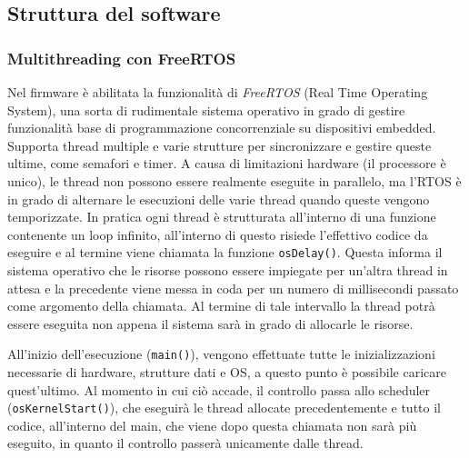 \subsection{Struttura del software}

\subsubsection{Multithreading con FreeRTOS}

Nel firmware \`e abilitata la funzionalit\`a di \textit{FreeRTOS} (Real Time Operating System), una sorta di rudimentale sistema operativo in grado di gestire funzionalit\`a base di programmazione concorrenziale su dispositivi embedded. Supporta thread multiple e varie strutture per sincronizzare e gestire queste ultime, come semafori e timer. A causa di limitazioni hardware (il processore \`e unico), le thread non possono essere realmente eseguite in parallelo, ma l'RTOS \`e in grado di alternare le esecuzioni delle varie thread quando queste vengono temporizzate. In pratica ogni thread \`e strutturata all'interno di una funzione contenente un loop infinito, all'interno di questo risiede l'effettivo codice da eseguire e al termine viene chiamata la funzione \texttt{osDelay()}. Questa informa il sistema operativo che le risorse possono essere impiegate per un'altra thread in attesa e la precedente viene messa in coda per un numero di millisecondi passato come argomento della chiamata. Al termine di tale intervallo la thread potr\`a essere eseguita non appena il sistema sar\`a in grado di allocarle le risorse.

All'inizio dell'esecuzione (\texttt{main()}), vengono effettuate tutte le inizializzazioni necessarie di hardware, strutture dati e OS, a questo punto \`e possibile caricare quest'ultimo. Al momento in cui ci\`o accade, il controllo passa allo scheduler (\texttt{osKernelStart()}), che eseguir\`a le thread allocate precedentemente e tutto il codice, all'interno del main, che viene dopo questa chiamata non sar\`a pi\`u eseguito, in quanto il controllo passer\`a unicamente dalle thread.

